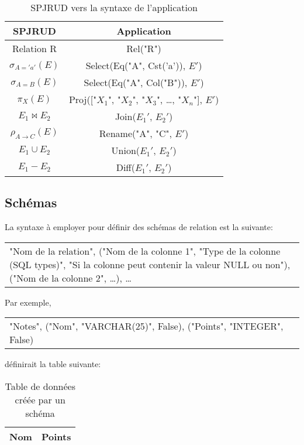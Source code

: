\documentclass[]{article}
\begin{document}
\begin{table}[H]
	\centering
	\begin{tabular}{| c | c |}
		\hline
		\textbf{SPJRUD} & \textbf{Application}\\
		\hline
		Relation R & Rel("R")\\
		\hline
		$\sigma_{A='a'}(E)$ & Select(Eq("A", Cst('a')), $E'$)\\
		\hline
		$\sigma_{A=B}(E)$ & Select(Eq("A", Col("B")), $E'$)\\
		\hline
		$\pi_{X}(E)$ & Proj(["$X_1$", "$X_2$", "$X_3$", \ldots, "$X_n$"], $E'$)\\
		\hline
		$E_1 \bowtie E_2$ & Join($E_1'$, $E_2'$)\\
		\hline
		$\rho_{A \to C}(E)$ & Rename("A", "C", $E'$)\\
		\hline
		$E_1 \cup E_2$ & Union($E_1'$, $E_2'$)\\
		\hline
		$E_1 - E_2$ & Diff($E_1'$, $E_2'$)\\
		\hline
	\end{tabular}
	\caption{SPJRUD vers la syntaxe de l'application}
\end{table}

\subsection{Sch\'emas}
La syntaxe \`a employer pour d\'efinir des sch\'emas de relation est la suivante:

\begin{center}
	\begin{tabular}{p{250px}}
		"Nom de la relation", ("Nom de la colonne 1", "Type de la colonne (SQL types)", "Si la colonne peut contenir la valeur NULL ou non"), ("Nom de la colonne 2", \ldots), \ldots
	\end{tabular}
\end{center}

Par exemple,
\begin{center}
	\begin{tabular}{p{250px}}
		"Notes", ("Nom", "VARCHAR(25)", False), ("Points", "INTEGER", False)
	\end{tabular}
\end{center}

d\'efinirait la table suivante:
\begin{table}[H]
	\centering
	\begin{tabular}{| c | c |}
		\hline
		\textbf{Nom} & \textbf{Points}\\
		\hline
	\end{tabular}
	\caption{Table de données créée par un schéma}
\end{table}
\end{document}
